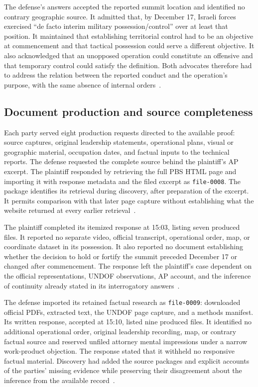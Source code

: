\documentclass[11pt]{article}
\newcommand{\code}[1]{\texttt{#1}}
\begin{document}
The defense's answers accepted the reported summit location and identified no contrary geographic source.  It admitted that, by December 17, Israeli forces exercised ``de facto interim military possession/control'' over at least that position.  It maintained that establishing territorial control had to be an objective at commencement and that tactical possession could serve a different objective.  It also acknowledged that an unopposed operation could constitute an offensive and that temporary control could satisfy the definition.  Both advocates therefore had to address the relation between the reported conduct and the operation's purpose, with the same absence of internal orders~\cite[event 27]{record}.

\subsection{Document production and source completeness}

Each party served eight production requests directed to the available proof: source captures, original leadership statements, operational plans, visual or geographic material, occupation dates, and factual inputs to the technical reports.  The defense requested the complete source behind the plaintiff's AP excerpt.  The plaintiff responded by retrieving the full PBS HTML page and importing it with response metadata and the filed excerpt as \code{file-0008}.  The package identifies its retrieval during discovery, after preparation of the excerpt.  It permits comparison with that later page capture without establishing what the website returned at every earlier retrieval~\cite[events 28--29 and 38, file 0008]{record}.

The plaintiff completed its itemized response at 15:03, listing seven produced files.  It reported no separate video, official transcript, operational order, map, or coordinate dataset in its possession.  It also reported no document establishing whether the decision to hold or fortify the summit preceded December 17 or changed after commencement.  The response left the plaintiff's case dependent on the official representations, UNDOF observations, AP account, and the inference of continuity already stated in its interrogatory answers~\cite[event 49]{record}.

The defense imported its retained factual research as \code{file-0009}: downloaded official PDFs, extracted text, the UNDOF page capture, and a methods manifest.  Its written response, accepted at 15:10, listed nine produced files.  It identified no additional operational order, original leadership recording, map, or contrary factual source and reserved unfiled attorney mental impressions under a narrow work-product objection.  The response stated that it withheld no responsive factual material.  Discovery had added the source packages and explicit accounts of the parties' missing evidence while preserving their disagreement about the inference from the available record~\cite[events 67 and 73, file 0009]{record}.
\end{document}
